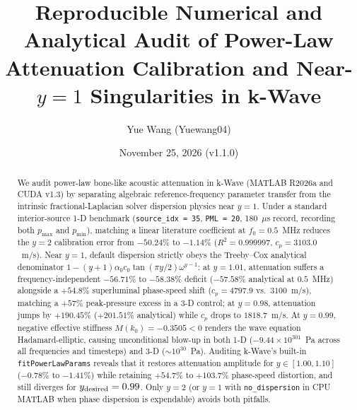 \documentclass[11pt]{article}
\title{Reproducible Numerical and Analytical Audit of Power-Law Attenuation Calibration and Near-$y=1$ Singularities in k-Wave}
\author{Yue Wang (Yuewang04)}
\date{November 25, 2026 (v1.1.0)}
\begin{document}
\maketitle

\begin{abstract}
We audit power-law bone-like acoustic attenuation in k-Wave (MATLAB R2026a and CUDA v1.3) by separating algebraic reference-frequency parameter transfer from the intrinsic fractional-Laplacian solver dispersion physics near $y=1$. Under a standard interior-source 1-D benchmark (\texttt{source\_idx = 35}, \texttt{PML = 20}, 180~$\mu$s record, recording both $p_{\max}$ and $p_{\min}$), matching a linear literature coefficient at $f_0 = 0.5$~MHz reduces the $y=2$ calibration error from $-50.24\%$ to $-1.14\%$ ($R^2 = 0.999997$, $c_p = 3103.0$~m/s). Near $y=1$, default dispersion strictly obeys the Treeby--Cox analytical denominator $1 - (y+1)\alpha_0 c_0 \tan(\pi y/2)\omega^{y-1}$: at $y=1.01$, attenuation suffers a frequency-independent $-56.71\%$ to $-58.38\%$ deficit ($-57.58\%$ analytical at $0.5$~MHz) alongside a $+54.8\%$ superluminal phase-speed shift ($c_p = 4797.9$ vs.\ $3100$~m/s), matching a $+57\%$ peak-pressure excess in a 3-D control; at $y=0.98$, attenuation jumps by $+190.45\%$ ($+201.51\%$ analytical) while $c_p$ drops to $1818.7$~m/s. At $y=0.99$, negative effective stiffness $M(k_0) = -0.3505 < 0$ renders the wave equation Hadamard-elliptic, causing unconditional blow-up in both 1-D ($-9.44\times 10^{301}$~Pa across all frequencies and timesteps) and 3-D ($\sim 10^{30}$~Pa). Auditing k-Wave's built-in \texttt{fitPowerLawParams} reveals that it restores attenuation amplitude for $y \in [1.00, 1.10]$ ($-0.78\%$ to $-1.41\%$) while retaining $+54.7\%$ to $+103.7\%$ phase-speed distortion, and still diverges for $y_{\rm desired}=0.99$. Only $y=2$ (or $y=1$ with \texttt{no\_dispersion} in CPU MATLAB when phase dispersion is expendable) avoids both pitfalls.
\end{abstract}
\end{document}
